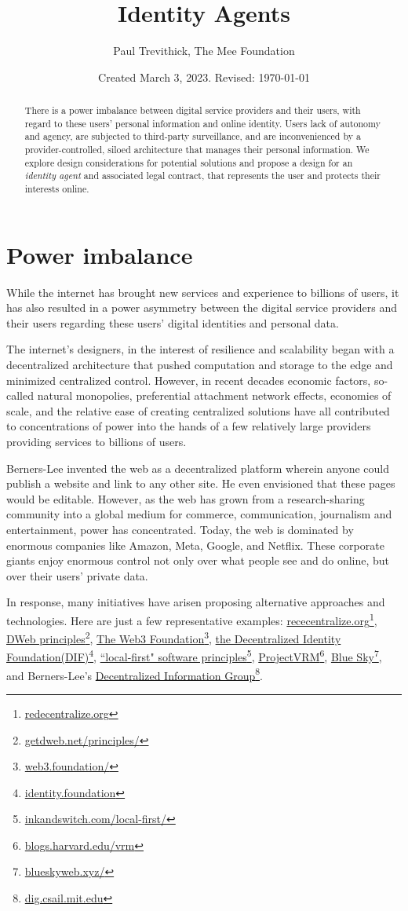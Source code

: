 \documentclass[11pt, oneside]{article}   	%
\title{Identity Agents}
\author{Paul Trevithick, The Mee Foundation}
\date{Created March 3, 2023. Revised: \today}							%
\newcommand{\hyperfootnote}[1][]{\def\ArgI{{#1}}\hyperfootnoteRelay}
\newcommand\hyperfootnoteRelay[2][]{\href{#1#2}{\ArgI}\footnote{\href{#1#2}{#2}}}
\begin{document}
\maketitle
\begin{abstract}
There is a power imbalance between digital service providers and their users, with regard to these users' personal information and online identity. Users lack of autonomy and agency, are subjected to third-party surveillance, and are inconvenienced by a provider-controlled, siloed architecture that manages their personal information. We explore design considerations for potential solutions and propose a design for an \emph{identity agent} and associated legal contract, that represents the user and protects their interests online.
\end{abstract}

\section{Power imbalance}
While the internet has brought new services and experience to billions of users, it has also resulted in a power asymmetry between the digital service providers and their users regarding these users' digital identities and personal data. 

The internet's designers, in the interest of resilience and scalability began with a decentralized architecture that pushed computation and storage to the edge and minimized centralized control. However, in recent decades economic factors, so-called natural monopolies, preferential attachment network effects, economies of scale, and the relative ease of creating centralized solutions have all contributed to concentrations of power into the hands of a few relatively large providers providing services to billions of users. 

Berners-Lee invented the web as a decentralized platform wherein anyone could publish a website and link to any other site. He even envisioned that these pages would be editable. However, as the web has grown from a research-sharing community into a global medium for commerce, communication, journalism and entertainment, power has concentrated. Today, the web is dominated by enormous companies like Amazon, Meta, Google, and Netflix. These corporate giants enjoy enormous control not only over what people see and do online, but over their users' private data.\cite{Finley2017}

In response, many initiatives have arisen proposing alternative approaches and technologies. Here are just a few representative examples: \hyperfootnote[rececentralize.org][https://]{redecentralize.org}, \hyperfootnote[DWeb principles][https://]{getdweb.net/principles/}, \hyperfootnote[The Web3 Foundation][https://]{web3.foundation/}, \hyperfootnote[the Decentralized Identity Foundation(DIF)][https://]{identity.foundation}, \hyperfootnote[``local-first" software principles][https://]{inkandswitch.com/local-first/}, \hyperfootnote[ProjectVRM][https://]{blogs.harvard.edu/vrm}, \hyperfootnote[Blue Sky][https://]{blueskyweb.xyz/}, and Berners-Lee's \hyperfootnote[Decentralized Information Group][https://]{dig.csail.mit.edu}. 
\end{document}

